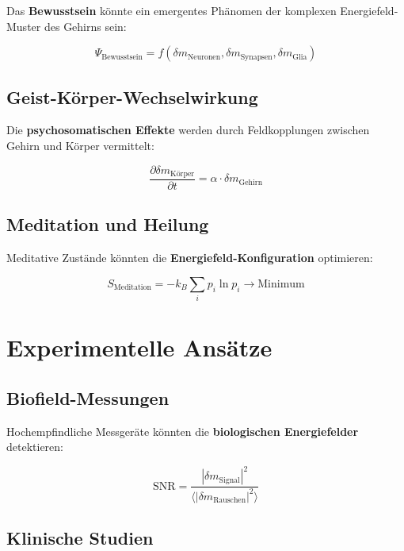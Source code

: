 \documentclass[12pt,a4paper]{report}
\begin{document}
	Das \textbf{Bewusstsein} könnte ein emergentes Phänomen der komplexen Energiefeld-Muster des Gehirns sein:
	
	\begin{equation}
		\Psi_{\text{Bewusstsein}} = f(\delta m_{\text{Neuronen}}, \delta m_{\text{Synapsen}}, \delta m_{\text{Glia}})
	\end{equation}
	
	\subsection{Geist-Körper-Wechselwirkung}
	
	Die \textbf{psychosomatischen Effekte} werden durch Feldkopplungen zwischen Gehirn und Körper vermittelt:
	
	\begin{equation}
		\frac{\partial\delta m_{\text{Körper}}}{\partial t} = \alpha \cdot \delta m_{\text{Gehirn}}
	\end{equation}
	
	\subsection{Meditation und Heilung}
	
	Meditative Zustände könnten die \textbf{Energiefeld-Konfiguration} optimieren:
	
	\begin{equation}
		S_{\text{Meditation}} = -k_B \sum_i p_i \ln p_i \to \text{Minimum}
	\end{equation}
	
	\section{Experimentelle Ansätze}
	
	\subsection{Biofield-Messungen}
	
	Hochempfindliche Messgeräte könnten die \textbf{biologischen Energiefelder} detektieren:
	
	\begin{equation}
		\text{SNR} = \frac{|\delta m_{\text{Signal}}|^2}{\langle|\delta m_{\text{Rauschen}}|^2\rangle}
	\end{equation}
	
	\subsection{Klinische Studien}
	
\end{document}

